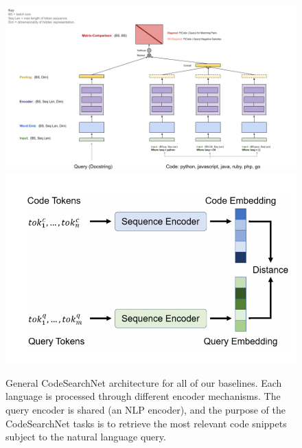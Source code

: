 \documentclass[10pt,twocolumn]{article}
\begin{document}
\begin{figure}[!ht]
    \centering
    \includegraphics[scale=0.15]{figures/codesearchnet_arch.png}
    \includegraphics[scale=0.15]{figures/codesearchnet_approach.png}
    \caption{General CodeSearchNet architecture for all of our baselines. Each language is processed through different encoder mechanisms. The query encoder is shared (an NLP encoder), and the purpose of the CodeSearchNet tasks is to retrieve the most relevant code snippets subject to the natural language query.}
    \label{fig:codesearchnet_arch}
\end{figure}
\end{document}

